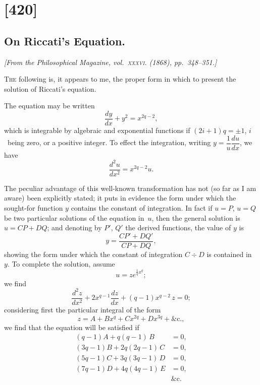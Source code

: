 \documentclass[11pt,a4paper]{article}
\theoremstyle{plain}
\theoremstyle{definition}
\begin{document}
\clearpage

\section{[420]}
\subsection{On Riccati's Equation.}

\begin{center}
\textit{[From the Philosophical Magazine, vol.~\textsc{xxxvi}. (1868), pp.~348--351.]}
\end{center}

\textsc{The} following is, it appears to me, the proper form in which to present the
solution of Riccati's equation.

The equation may be written
\[
\frac{dy}{dx} + y^2 = x^{2q-2},
\]
which is integrable by algebraic and exponential functions if $(2i+1)q = \pm 1$,
$i$~being zero, or a positive integer.  To effect the integration, writing $y = \dfrac{1}{u}\dfrac{du}{dx}$,
we have
\[
\frac{d^2u}{dx^2} = x^{2q-2}u.
\]

The peculiar advantage of this well-known transformation has not (so far as I am
aware) been explicitly stated; it puts in evidence the form under which the
sought-for function $y$ contains the constant of integration.  In fact if $u=P$, $u=Q$
be two particular solutions of the equation in~$u$, then the general solution is
$u = CP + DQ$; and denoting by $P'$, $Q'$ the derived functions, the value of $y$ is
\[
y = \frac{CP' + DQ'}{CP + DQ},
\]
showing the form under which the constant of integration $C \div D$ is contained in~$y$.
To complete the solution, assume
\[
u = ze^{\frac{1}{q}x^q};
\]
we find
\[
\frac{d^2z}{dx^2} + 2x^{q-1}\frac{dz}{dx} + (q-1)x^{q-2}\,z = 0;
\]
considering first the particular integral of the form
\[
z = A + Bx^q + Cx^{2q} + Dx^{3q} + \&\text{c.},
\]
we find that the equation will be satisfied if
\begin{align*}
(q-1)A + q(q-1)\,B &= 0, \\
(3q-1)B + 2q(2q-1)\,C &= 0, \\
(5q-1)C + 3q(3q-1)\,D &= 0, \\
(7q-1)D + 4q(4q-1)\,E &= 0, \\
&\&\text{c.}
\end{align*}
\end{document}
